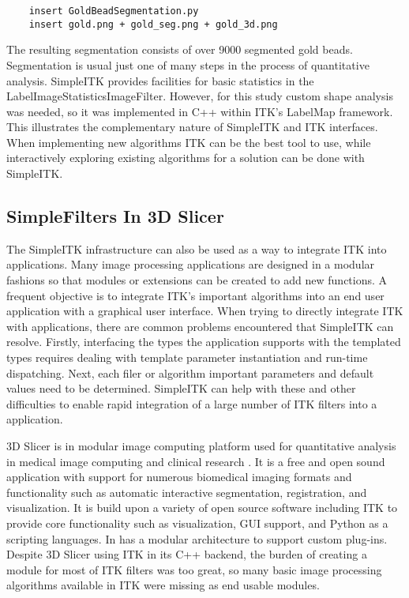 \documentclass{frontiersMED} %
\begin{document}
\begin{verbatim}
	insert GoldBeadSegmentation.py
	insert gold.png + gold_seg.png + gold_3d.png
\end{verbatim}

The resulting segmentation consists of over 9000 segmented gold
beads. Segmentation is usual just one of many steps in the process of
quantitative analysis. SimpleITK provides facilities for basic
statistics in the LabelImageStatisticsImageFilter. However, for this
study custom shape analysis was needed, so it was implemented in C++
within ITK’s LabelMap framework. This illustrates the complementary
nature of SimpleITK and ITK interfaces. When implementing new
algorithms ITK can be the best tool to use, while interactively
exploring existing algorithms for a solution can be done with
SimpleITK. 

\subsection{SimpleFilters In 3D Slicer}
The SimpleITK infrastructure can also be used as a way to integrate
ITK into applications. Many image processing applications are designed
in a modular fashions so that modules or extensions can be created to
add new functions. A frequent objective is to integrate ITK’s
important algorithms into an end user application with a graphical
user interface. When trying to directly integrate ITK with
applications, there are common problems encountered that SimpleITK can
resolve.  Firstly, interfacing the types the application supports with
the templated types requires dealing with template parameter
instantiation and run-time dispatching. Next, each filer or algorithm
important parameters and default values need to be
determined. SimpleITK can help with these and other difficulties to
enable rapid integration of a large number of ITK filters into a
application. 

3D Slicer is in modular image computing platform used for quantitative
analysis in medical image computing and clinical research
\cite{Fedorov2012}. It is a free and open sound application with support
for numerous biomedical imaging formats and functionality such as
automatic interactive segmentation, registration, and
visualization. It is build upon a variety of open source software
including ITK to provide core functionality such as visualization, GUI
support, and Python as a scripting languages. In has a modular
architecture to support custom plug-ins. Despite 3D Slicer using ITK
in its C++ backend, the burden of creating a module for most of ITK
filters was too great, so many basic image processing algorithms
available in ITK were missing as end usable modules.
\end{document}
